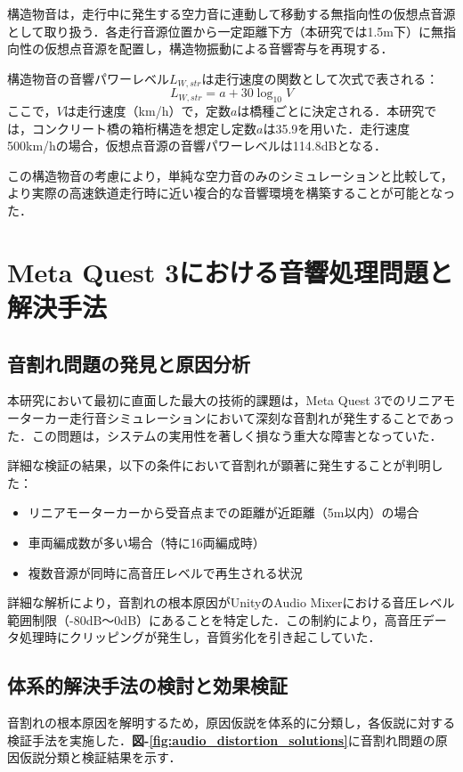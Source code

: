 \documentclass[10pt]{jsarticle}
\begin{document}
構造物音は，走行中に発生する空力音に連動して移動する無指向性の仮想点音源として取り扱う．各走行音源位置から一定距離下方（本研究では1.5m下）に無指向性の仮想点音源を配置し，構造物振動による音響寄与を再現する．

構造物音の音響パワーレベル$L_{W,str}$は走行速度の関数として次式で表される：
\begin{equation}
L_{W,str} = a + 30 \log_{10} V
\end{equation}
ここで，$V$は走行速度（km/h）で，定数$a$は橋種ごとに決定される．本研究では，コンクリート橋の箱桁構造を想定し定数$a$は35.9を用いた．走行速度500km/hの場合，仮想点音源の音響パワーレベルは114.8dBとなる．

この構造物音の考慮により，単純な空力音のみのシミュレーションと比較して，より実際の高速鉄道走行時に近い複合的な音響環境を構築することが可能となった．

\section{Meta Quest 3における音響処理問題と解決手法}
\subsection{音割れ問題の発見と原因分析}
本研究において最初に直面した最大の技術的課題は，Meta Quest 3でのリニアモーターカー走行音シミュレーションにおいて深刻な音割れが発生することであった．この問題は，システムの実用性を著しく損なう重大な障害となっていた．

詳細な検証の結果，以下の条件において音割れが顕著に発生することが判明した：
\begin{itemize}
\item リニアモーターカーから受音点までの距離が近距離（5m以内）の場合
\item 車両編成数が多い場合（特に16両編成時）
\item 複数音源が同時に高音圧レベルで再生される状況
\end{itemize}

詳細な解析により，音割れの根本原因がUnityのAudio Mixerにおける音圧レベル範囲制限（-80dB〜0dB）にあることを特定した．この制約により，高音圧データ処理時にクリッピングが発生し，音質劣化を引き起こしていた．

\subsection{体系的解決手法の検討と効果検証}
音割れの根本原因を解明するため，原因仮説を体系的に分類し，各仮説に対する検証手法を実施した．\textbf{図-\ref{fig:audio_distortion_solutions}}に音割れ問題の原因仮説分類と検証結果を示す．
\end{document}
